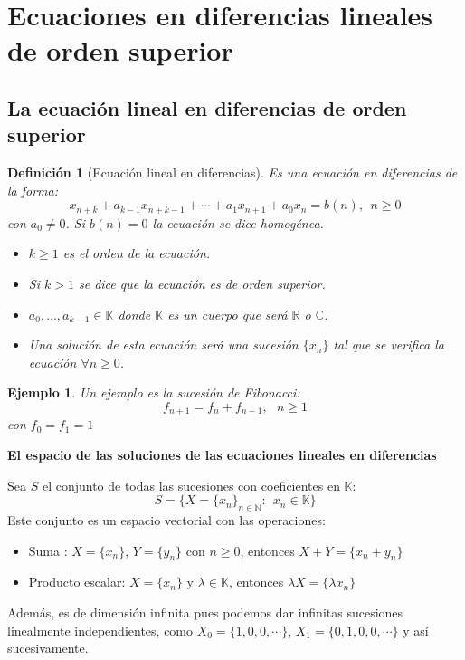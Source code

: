 \documentclass[11pt, a4paper, titlepage]{article}
\newcommand{\R}{\mathbb{R}}
\theoremstyle{theorem-style}
\theoremstyle{definition-style}
\newtheorem*{ndef}{Definición}
\theoremstyle{remark-style}
\theoremstyle{example-style}
\newtheorem*{ejemplo}{Ejemplo}
\begin{document}
\section{Ecuaciones en diferencias lineales de orden superior}
\subsection{La ecuación lineal en diferencias de orden superior}
\begin{ndef}[Ecuación lineal en diferencias]
  Es una ecuación en diferencias de la forma:
  \[
    x_{n+k}+ a_{k-1}x_{n+k-1}+ \cdots + a_1 x_{n+1} + a_0 x_n = b(n), \ \ n \geq
    0
  \]
  con $a_0 \ne 0$. Si $b(n)= 0$ la ecuación se dice homogénea.
	
  \begin{itemize}
  \item $k \geq 1 $ es el orden de la ecuación.
  \item Si $k > 1$ se dice que la ecuación es de orden superior.
  \item $a_0,\dots,a_{k-1} \in \mathbb K $ donde $\mathbb K $ es un cuerpo que
    será $\R $ o $\mathbb C$.
  \item Una solución de esta ecuación será una sucesión $\{x_n\}$ tal que se
    verifica la ecuación $\forall n \geq 0$.
  \end{itemize}
\end{ndef}
\begin{ejemplo}
  Un ejemplo es la sucesión de Fibonacci:
  \[
    f_{n+1}= f_n+ f_{n-1}, \ \ \ n \geq 1
  \]
  con $f_0 = f_1 = 1$
\end{ejemplo}

\textbf{El espacio de las soluciones de las ecuaciones lineales en diferencias}

Sea $S$ el conjunto de todas las sucesiones con coeficientes en $\mathbb K$:
\[
  S= \{X=\{x_n\}_{n\in \mathbb N}: \ \ x_n \in \mathbb K\}
\]
Este conjunto es un espacio vectorial con las operaciones:
\begin{itemize}
\item Suma : $X= \{x_n\}$, $Y = \{y_n\}$ con $n\geq 0$, entonces
  $X+Y=\{x_n+y_n\}$
\item Producto escalar: $X= \{x_n\}$ y $\lambda \in \mathbb K$, entonces
  $\lambda X= \{\lambda x_n\}$
\end{itemize}
Además, es de dimensión infinita pues podemos dar infinitas sucesiones
linealmente independientes, como $X_0 = \{1, 0, 0, \cdots\}$,
$X_1=\{0,1,0,0,\cdots\}$ y así sucesivamente.
\end{document}
